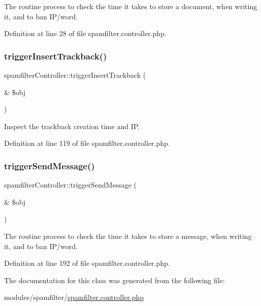 The routine process to check the time it takes to store a document, when writing it, and to ban I\+P/word. 



Definition at line 28 of file spamfilter.\+controller.\+php.

\hypertarget{classspamfilterController_ace7cf6178aa16638526af5d73a9554eb}{}\label{classspamfilterController_ace7cf6178aa16638526af5d73a9554eb} 
\subsubsection{\texorpdfstring{trigger\+Insert\+Trackback()}{triggerInsertTrackback()}}
{\footnotesize\ttfamily spamfilter\+Controller\+::trigger\+Insert\+Trackback (\begin{DoxyParamCaption}\item[{\&}]{\$obj }\end{DoxyParamCaption})}



Inspect the trackback creation time and IP. 



Definition at line 119 of file spamfilter.\+controller.\+php.

\hypertarget{classspamfilterController_ab449e4ff64d26ae0ad3660522dbd396f}{}\label{classspamfilterController_ab449e4ff64d26ae0ad3660522dbd396f} 
\subsubsection{\texorpdfstring{trigger\+Send\+Message()}{triggerSendMessage()}}
{\footnotesize\ttfamily spamfilter\+Controller\+::trigger\+Send\+Message (\begin{DoxyParamCaption}\item[{\&}]{\$obj }\end{DoxyParamCaption})}



The routine process to check the time it takes to store a message, when writing it, and to ban I\+P/word. 



Definition at line 192 of file spamfilter.\+controller.\+php.



The documentation for this class was generated from the following file\+:\begin{DoxyCompactItemize}
\item 
modules/spamfilter/\hyperlink{spamfilter_8controller_8php}{spamfilter.\+controller.\+php}\end{DoxyCompactItemize}
